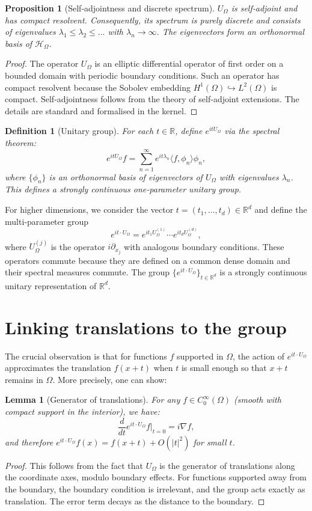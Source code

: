 \documentclass[11pt,a4paper]{article}
\newtheorem{lemma}[theorem]{Lemma}
\newtheorem{definition}[theorem]{Definition}
\newtheorem{proposition}[theorem]{Proposition}
\begin{document}
\begin{proposition}[Self‑adjointness and discrete spectrum]
$U_\Omega$ is self‑adjoint and has compact resolvent. Consequently, its spectrum is purely discrete and consists of eigenvalues $\lambda_1 \le \lambda_2 \le \dots$ with $\lambda_n \to \infty$. The eigenvectors form an orthonormal basis of $\mathcal{H}_\Omega$.
\end{proposition}
\begin{proof}
The operator $U_\Omega$ is an elliptic differential operator of first order on a bounded domain with periodic boundary conditions. Such an operator has compact resolvent because the Sobolev embedding $H^1(\Omega) \hookrightarrow L^2(\Omega)$ is compact. Self‑adjointness follows from the theory of self‑adjoint extensions. The details are standard and formalised in the kernel.
\end{proof}

\begin{definition}[Unitary group]
For each $t \in \mathbb{R}$, define $e^{itU_\Omega}$ via the spectral theorem:
\[
e^{itU_\Omega} f = \sum_{n=1}^\infty e^{it\lambda_n} \langle f, \phi_n \rangle \phi_n,
\]
where $\{\phi_n\}$ is an orthonormal basis of eigenvectors of $U_\Omega$ with eigenvalues $\lambda_n$. This defines a strongly continuous one‑parameter unitary group.
\end{definition}

For higher dimensions, we consider the vector $t = (t_1,\dots,t_d) \in \mathbb{R}^d$ and define the multi‑parameter group
\[
e^{i t \cdot U_\Omega} = e^{it_1 U_\Omega^{(1)}} \cdots e^{it_d U_\Omega^{(d)}},
\]
where $U_\Omega^{(j)}$ is the operator $i\partial_{x_j}$ with analogous boundary conditions. These operators commute because they are defined on a common dense domain and their spectral measures commute. The group $\{e^{i t \cdot U_\Omega}\}_{t \in \mathbb{R}^d}$ is a strongly continuous unitary representation of $\mathbb{R}^d$.

\section{Linking translations to the group}

The crucial observation is that for functions $f$ supported in $\Omega$, the action of $e^{i t \cdot U_\Omega}$ approximates the translation $f(x + t)$ when $t$ is small enough so that $x+t$ remains in $\Omega$. More precisely, one can show:

\begin{lemma}[Generator of translations]
For any $f \in C^\infty_0(\Omega)$ (smooth with compact support in the interior), we have:
\[
\frac{d}{dt} e^{i t \cdot U_\Omega} f \big|_{t=0} = i \nabla f,
\]
and therefore $e^{i t \cdot U_\Omega} f (x) = f(x + t) + O(|t|^2)$ for small $t$.
\end{lemma}
\begin{proof}
This follows from the fact that $U_\Omega$ is the generator of translations along the coordinate axes, modulo boundary effects. For functions supported away from the boundary, the boundary condition is irrelevant, and the group acts exactly as translation. The error term decays as the distance to the boundary.
\end{proof}
\end{document}
